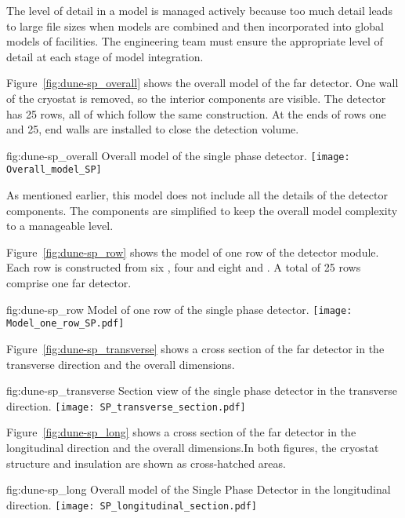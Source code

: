 The level of detail in a model is managed actively because too much
detail leads to large file sizes when models are combined and then
incorporated into global models of facilities. The 
engineering team must ensure the appropriate level of detail at each
stage of model integration.


Figure~\ref{fig:dune-sp_overall} shows the overall model of the
 far detector. One wall of the cryostat is removed, so the
interior components are visible. The detector has 25 rows, all of
which follow the same construction. At the ends of rows one and 25,
end walls are installed to close the detection volume.
\begin{dunefigure}{fig:dune-sp_overall}
  {Overall model of the single phase detector.}
  \texttt{[image: Overall\_model\_SP]}
\end{dunefigure}
As mentioned earlier, this model does not include all the details of
the detector components. The components are simplified to keep the
overall model complexity to a manageable level.


Figure~\ref{fig:dune-sp_row} shows the model of one row of the
detector module. Each row is constructed from six , four
 and eight  and . A total of 25 rows
comprise one  far detector.
\begin{dunefigure}{fig:dune-sp_row}
  {Model of one row of the single phase detector.}
  \texttt{[image: Model\_one\_row\_SP.pdf]}
\end{dunefigure}


Figure~\ref{fig:dune-sp_transverse} shows a cross section of the
 far detector in the transverse direction and the overall
dimensions.
\begin{dunefigure}{fig:dune-sp_transverse}
  {Section view of the single phase detector in the transverse
    direction.}
  \texttt{[image: SP\_transverse\_section.pdf]}
\end{dunefigure}
Figure~\ref{fig:dune-sp_long} shows a cross section of the
 far detector in the longitudinal direction and the overall
dimensions.In both figures, the cryostat structure and insulation are shown
as cross-hatched areas.
\begin{dunefigure}{fig:dune-sp_long}
  {Overall model of the Single Phase Detector in the longitudinal direction.}
  \texttt{[image: SP\_longitudinal\_section.pdf]}
\end{dunefigure}



